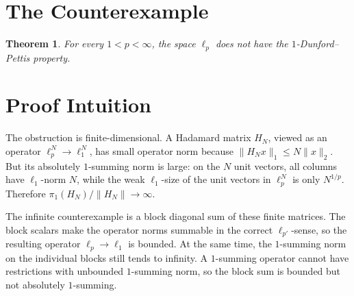 \documentclass[11pt]{article}
\newtheorem{theorem}{Theorem}
\newcommand{\piOne}{\pi_1}
\begin{document}
\section*{The Counterexample}

\begin{theorem}
For every \(1<p<\infty\), the space \(\ell_p\) does not have the
\(1\)-Dunford--Pettis property.
\end{theorem}

\section*{Proof Intuition}

The obstruction is finite-dimensional.  A Hadamard matrix \(H_N\), viewed as
an operator \(\ell_p^N\to\ell_1^N\), has small operator norm because
\(\|H_Nx\|_1\le N\|x\|_2\).  But its absolutely \(1\)-summing norm is large:
on the \(N\) unit vectors, all columns have \(\ell_1\)-norm \(N\), while the
weak \(\ell_1\)-size of the unit vectors in \(\ell_p^N\) is only \(N^{1/p}\).
Therefore \(\piOne(H_N)/\|H_N\|\to\infty\).

The infinite counterexample is a block diagonal sum of these finite matrices.
The block scalars make the operator norms summable in the correct
\(\ell_{p'}\)-sense, so the resulting operator \(\ell_p\to\ell_1\) is bounded.
At the same time, the \(1\)-summing norm on the individual blocks still tends
to infinity.  A \(1\)-summing operator cannot have restrictions with
unbounded \(1\)-summing norm, so the block sum is bounded but not
absolutely \(1\)-summing.
\end{document}
